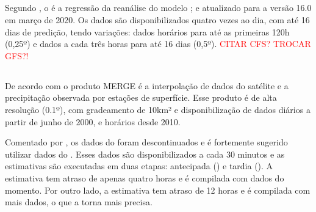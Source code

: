 

\subsection{}

\indent Segundo , o  é a regressão da reanálise do modelo ; e atualizado para a versão 16.0 em março de 2020. Os dados são disponibilizados quatro vezes ao dia, com até 16 dias de predição, tendo variações: dados horários para até as primeiras 120h (0,25º) e dados a cada três horas para até 16 dias (0,5º). \textcolor{red}{CITAR CFS? TROCAR GFS?!}

\subsection{}

\indent De acordo com  o produto \acrshort{MERGE} é a interpolação de dados do satélite  e a precipitação observada por estações de superfície. Esse produto é de alta resolução (0.1º), com gradeamento de 10km² e disponibilização de dados diários a partir de junho de 2000, e horários desde 2010.

\indent Comentado por , os dados do  foram descontinuados e é fortemente sugerido utilizar dados do . Esses dados são disponibilizados a cada 30 minutos e as estimativas são executadas em duas etapas: antecipada () e tardia (). A estimativa  tem atraso de apenas quatro horas e é compilada com dados do momento. Por outro lado, a estimativa  tem atraso de 12 horas e é compilada com mais dados, o que a torna mais precisa.


